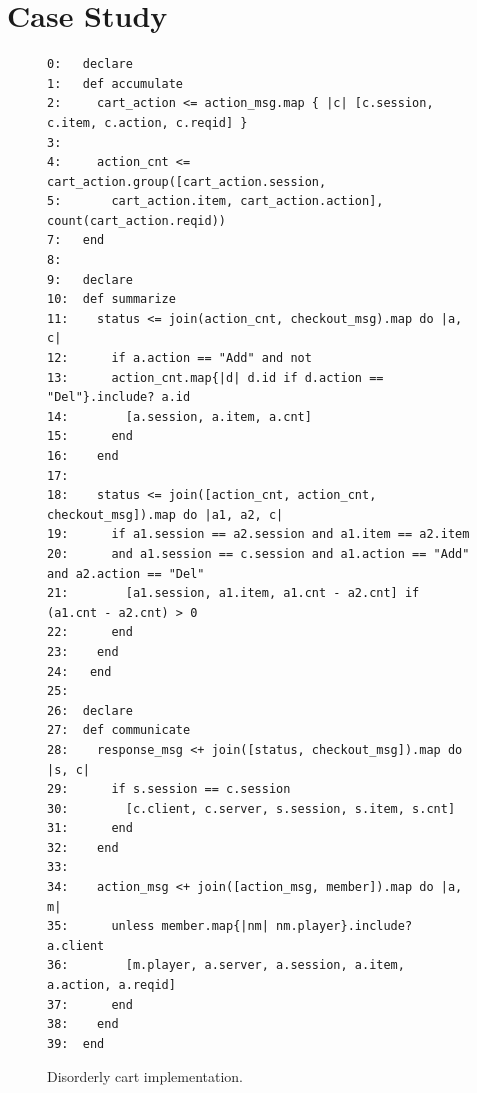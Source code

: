 \section{Case Study}
\label{sec:case}

\begin{figure}[t]
\begin{scriptsize}
\begin{verbatim}
0:   declare
1:   def accumulate
2:     cart_action <= action_msg.map { |c| [c.session, c.item, c.action, c.reqid] }
3:
4:     action_cnt <= cart_action.group([cart_action.session, 
5:       cart_action.item, cart_action.action], count(cart_action.reqid))
7:   end
8:
9:   declare
10:  def summarize
11:    status <= join(action_cnt, checkout_msg).map do |a, c| 
12:      if a.action == "Add" and not 
13:      action_cnt.map{|d| d.id if d.action == "Del"}.include? a.id 
14:        [a.session, a.item, a.cnt] 
15:      end 
16:    end
17:
18:    status <= join([action_cnt, action_cnt, checkout_msg]).map do |a1, a2, c| 
19:      if a1.session == a2.session and a1.item == a2.item 
20:      and a1.session == c.session and a1.action == "Add" and a2.action == "Del"
21:        [a1.session, a1.item, a1.cnt - a2.cnt] if (a1.cnt - a2.cnt) > 0
22:      end
23:    end
24:   end
25:
26:  declare 
27:  def communicate
28:    response_msg <+ join([status, checkout_msg]).map do |s, c| 
29:      if s.session == c.session
30:        [c.client, c.server, s.session, s.item, s.cnt]
31:      end
32:    end
33: 
34:    action_msg <+ join([action_msg, member]).map do |a, m|
35:      unless member.map{|nm| nm.player}.include? a.client
36:        [m.player, a.server, a.session, a.item, a.action, a.reqid]
37:      end 
38:    end
39:  end
\end{verbatim}
\vspace{-10pt}
\caption{Disorderly cart implementation.}
\label{fig:pdg-disorderly}
\end{scriptsize}
\vspace{-2pt}
\end{figure}


